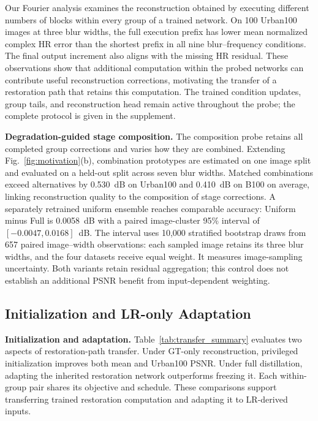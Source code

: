 \documentclass[10pt,journal,letterpaper]{IEEEtran}
\begin{document}
Our Fourier analysis examines the reconstruction obtained by executing different numbers of blocks within every group of a trained network. On 100 Urban100 images at three blur widths, the full execution prefix has lower mean normalized complex HR error than the shortest prefix in all nine blur--frequency conditions. The final output increment also aligns with the missing HR residual. These observations show that additional computation within the probed networks can contribute useful reconstruction corrections, motivating the transfer of a restoration path that retains this computation. The trained condition updates, group tails, and reconstruction head remain active throughout the probe; the complete protocol is given in the supplement.


\noindent\textbf{Degradation-guided stage composition.}
The composition probe retains all completed group corrections and varies how they are combined. Extending Fig.~\ref{fig:motivation}(b), combination prototypes are estimated on one image split and evaluated on a held-out split across seven blur widths. Matched combinations exceed alternatives by 0.530~dB on Urban100 and 0.410~dB on B100 on average, linking reconstruction quality to the composition of stage corrections. A separately retrained uniform ensemble reaches comparable accuracy: Uniform minus Full is 0.0058~dB with a paired image-cluster 95\% interval of $[-0.0047,0.0168]$~dB. The interval uses 10,000 stratified bootstrap draws from 657 paired image--width observations: each sampled image retains its three blur widths, and the four datasets receive equal weight. It measures image-sampling uncertainty. Both variants retain residual aggregation; this control does not establish an additional PSNR benefit from input-dependent weighting.



\subsection{Initialization and LR-only Adaptation}

\noindent\textbf{Initialization and adaptation.}
Table~\ref{tab:transfer_summary} evaluates two aspects of restoration-path transfer. Under GT-only reconstruction, privileged initialization improves both mean and Urban100 PSNR. Under full distillation, adapting the inherited restoration network outperforms freezing it. Each within-group pair shares its objective and schedule. These comparisons support transferring trained restoration computation and adapting it to LR-derived inputs.
\end{document}
